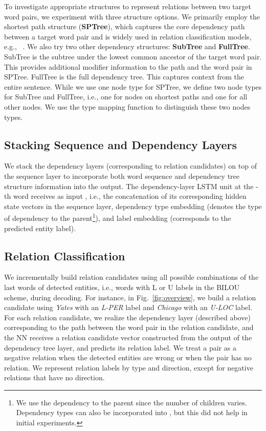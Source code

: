 \documentclass[11pt]{article}
\begin{document}
To investigate appropriate structures to represent relations between two target word pairs, we experiment with three structure options. We primarily employ the shortest path structure ({\bf SPTree}), which captures the core dependency path between a target word pair and is widely used in relation classification models, e.g., ~\cite{bunescu2005shortest,xu-EtAl:2015:EMNLP1}.
We also try two other dependency structures: {\bf SubTree} and {\bf FullTree}. 
SubTree is the subtree under the lowest common ancestor of the target word pair. This provides additional modifier information to the path and the word pair in SPTree. FullTree is the full dependency tree. This captures context from the entire sentence. While we use one node type for SPTree, we define two node types for SubTree and FullTree, i.e., one for nodes on shortest paths and one for all other nodes. We use the type mapping function  to distinguish these two nodes types.

\subsection{Stacking Sequence and Dependency Layers} 

We stack the dependency layers (corresponding to relation candidates) on top of the sequence layer to incorporate both word sequence and dependency tree structure information into the output.
The dependency-layer LSTM unit at the -th word receives as input , i.e., the concatenation of its corresponding hidden state
vectors  in the sequence layer, dependency type embedding  (denotes the type of dependency to the parent{\footnote{We use the dependency to the parent since the number of children varies. Dependency types can also be incorporated into , but this did not help in initial experiments.}}), and label embedding  (corresponds to the predicted entity label).

\subsection{Relation Classification}

We incrementally build relation candidates using all possible combinations of the last words of detected entities, i.e., words with L or U labels in the BILOU scheme, during decoding. For instance, in Fig.~\ref{fig:overview}, we build a relation candidate using {\it Yates} with an {\it L-PER} label and {\it Chicago} with an {\it U-LOC} label.
For each relation candidate, we realize the dependency layer  (described above) corresponding to the path between the word pair  in the relation candidate, and the NN receives a relation candidate vector constructed from the output of the dependency tree layer, and predicts its relation label. We treat a pair as a negative relation when the detected entities are wrong or when the pair has no relation. We represent relation labels by type and direction, except for negative relations that have no direction. 
\end{document}
